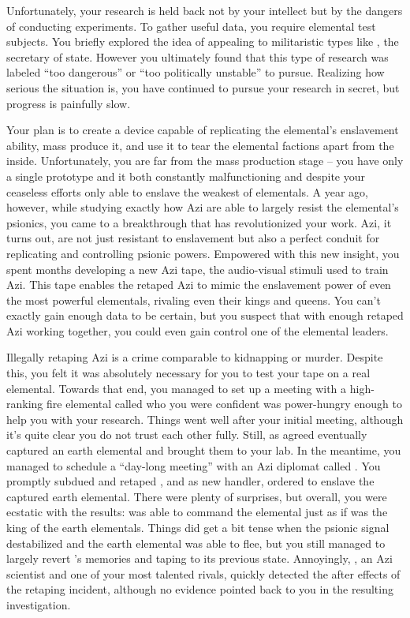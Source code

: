 \documentclass[char]{elementals}
\begin{document}
Unfortunately, your research is held back not by your intellect but by the dangers of conducting experiments. To gather useful data, you require elemental test subjects. You briefly explored the idea of appealing to militaristic types like \cDema{\intro}, the secretary of state. However you ultimately found that this type of research was labeled ``too dangerous'' or ``too politically unstable'' to pursue. Realizing how serious the situation is, you have continued to pursue your research in secret, but progress is painfully slow.

Your plan is to create a device capable of replicating the elemental's enslavement ability, mass produce it, and use it to tear the elemental factions apart from the inside. Unfortunately, you are far from the mass production stage -- you have only a single prototype and it both constantly malfunctioning and despite your ceaseless efforts only able to enslave the weakest of elementals. A year ago, however, while studying exactly how Azi are able to largely resist the elemental's psionics, you came to a breakthrough that has revolutionized your work. Azi, it turns out, are not just resistant to enslavement but also a perfect conduit for replicating and controlling psionic powers. Empowered with this new insight, you spent months developing a new Azi tape, the audio-visual stimuli used to train Azi. This tape enables the retaped Azi to mimic the enslavement power of even the most powerful elementals, rivaling even their kings and queens. You can't exactly gain enough data to be certain, but you suspect that with enough retaped Azi working together, you could even gain control one of the elemental leaders.

Illegally retaping Azi is a crime comparable to kidnapping or murder. Despite this, you felt it was absolutely necessary for you to test your tape on a real elemental. Towards that end, you managed to set up a meeting with a high-ranking fire elemental called \cPyro{\intro} who you were confident was power-hungry enough to help you with your research. Things went well after your initial meeting, although it's quite clear you do not trust each other fully. Still, as agreed \cPyro{} eventually captured an earth elemental and brought them to your lab. In the meantime, you managed to schedule a ``day-long meeting'' with an Azi diplomat called \cDiplomat{\intro}. You promptly subdued and retaped \cDiplomat{}, and as \cDiplomat{\their} new handler, ordered \cDiplomat{\them} to enslave the captured earth elemental. There were plenty of surprises, but overall, you were ecstatic with the results: \cDiplomat{} was able to command the elemental just as if \cDiplomat{\they} was the king of the earth elementals. Things did get a bit tense when the psionic signal destabilized and the earth elemental was able to flee, but you still managed to largely revert \cDiplomat{}'s memories and taping to its previous state. Annoyingly, \cScientist{\intro}, an Azi scientist and one of your most talented rivals, quickly detected the after effects of the retaping incident, although no evidence pointed back to you in the resulting investigation.
\end{document}
